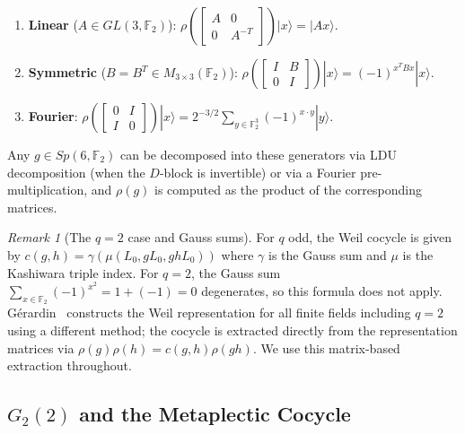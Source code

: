 \documentclass[11pt,a4paper]{article}
\theoremstyle{remark}
\newtheorem{remark}[theorem]{Remark}
\begin{document}
\begin{enumerate}
  \item \textbf{Linear} ($A \in GL(3,\mathbb{F}_2)$):
        $\rho\!\left(\left[\begin{smallmatrix}A & 0 \\ 0 & A^{-T}\end{smallmatrix}\right]\right)
        |x\rangle = |Ax\rangle$.

  \item \textbf{Symmetric} ($B = B^T \in M_{3\times 3}(\mathbb{F}_2)$):
        $\rho\!\left(\left[\begin{smallmatrix}I & B \\ 0 & I\end{smallmatrix}\right]\right)
        |x\rangle = (-1)^{x^T B x}|x\rangle$.

  \item \textbf{Fourier}:
        $\rho\!\left(\left[\begin{smallmatrix}0 & I \\ I & 0\end{smallmatrix}\right]\right)
        |x\rangle = 2^{-3/2} \sum_{y \in \mathbb{F}_2^3} (-1)^{x \cdot y} |y\rangle$.
\end{enumerate}

Any $g \in Sp(6,\mathbb{F}_2)$ can be decomposed into these generators via
LDU decomposition (when the $D$-block is invertible) or via a Fourier
pre-multiplication, and $\rho(g)$ is computed as the product of the
corresponding matrices.

\begin{remark}[The $q=2$ case and Gauss sums]
For $q$ odd, the Weil cocycle is given by
$c(g,h) = \gamma(\mu(L_0, gL_0, ghL_0))$
where $\gamma$ is the Gauss sum and $\mu$ is the Kashiwara triple index.
For $q=2$, the Gauss sum $\sum_{x \in \mathbb{F}_2} (-1)^{x^2} = 1 + (-1) = 0$
degenerates, so this formula does not apply.
G\'erardin~\cite{Gerardin} constructs the Weil representation for all finite
fields including $q=2$ using a different method; the cocycle is extracted directly
from the representation matrices via $\rho(g)\rho(h) = c(g,h)\rho(gh)$.
We use this matrix-based extraction throughout.
\end{remark}

\subsection{\texorpdfstring{$G_2(2)$ and the Metaplectic Cocycle}{G2(2) and the Metaplectic Cocycle}}
\end{document}
